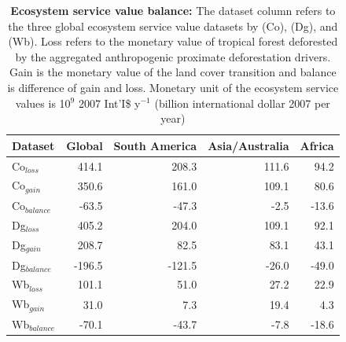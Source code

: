 		\begin{table}[ht]
			\centering
			\caption[Ecosystem service value balance]{\textbf{Ecosystem service value balance:} The dataset column refers to the three global ecosystem service value datasets by \citet{Groot2012} (Co), \citet{Costanza2014} (Dg), and \citet{Siikamaki2015} (Wb). Loss refers to the monetary value of tropical forest deforested by the aggregated anthropogenic proximate deforestation drivers. Gain is the monetary value of the land cover transition and balance is difference of gain and loss. Monetary unit of the ecosystem service values is 10$^{9}$ 2007 Int'I\$ y$^{-1}$ (billion international dollar 2007 per year)}
			\label{tab:esv_results}
			\begin{tabular}{lrrrr}
				\hline
				Dataset & Global & South America & Asia/Australia & Africa \\
				\hline
				Co$_{loss}$ & 414.1 & 208.3 & 111.6 & 94.2\\
				Co$_{gain}$ & 350.6 & 161.0 & 109.1 & 80.6\\
				Co$_{balance}$ & -63.5 & -47.3 & -2.5 & -13.6\\
				Dg$_{loss}$ & 405.2 & 204.0 & 109.1 & 92.1\\
				Dg$_{gain}$ & 208.7 & 82.5 & 83.1 & 43.1\\
				Dg$_{balance}$ & -196.5 & -121.5 & -26.0 & -49.0\\
				Wb$_{loss}$ & 101.1 & 51.0 & 27.2 & 22.9\\
				Wb$_{gain}$ & 31.0 & 7.3 & 19.4 & 4.3\\
				Wb$_{balance}$ & -70.1 & -43.7 & -7.8 & -18.6\\
				\hline
			\end{tabular}
		\end{table}

